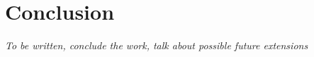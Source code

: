 \section{Conclusion}
\textit{To be written, conclude the work, talk about possible future extensions}